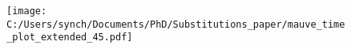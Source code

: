 \documentclass[12pt]{article}
\newcommand{\s}{\textit{Sinorhizobium}\xspace}
\newcommand{\bur}{\textit{Burkholderia}\xspace}
\newcommand{\vib}{\textit{Vibrio}\xspace}
\newcommand{\sul}{\textit{Sulfolobus}\xspace}
\newcommand{\bor}{\textit{Bordetella}\xspace}
\newcommand{\xan}{\textit{Xanthomonas}\xspace}
\begin{document}
\newpage


\begin{figure}
	\texttt{[image: C:/Users/synch/Documents/PhD/Substitutions\_paper/mauve\_time\_plot\_extended\_45.pdf]}
	\caption{\label{mauve_45}}	
\end{figure}
\end{document}
